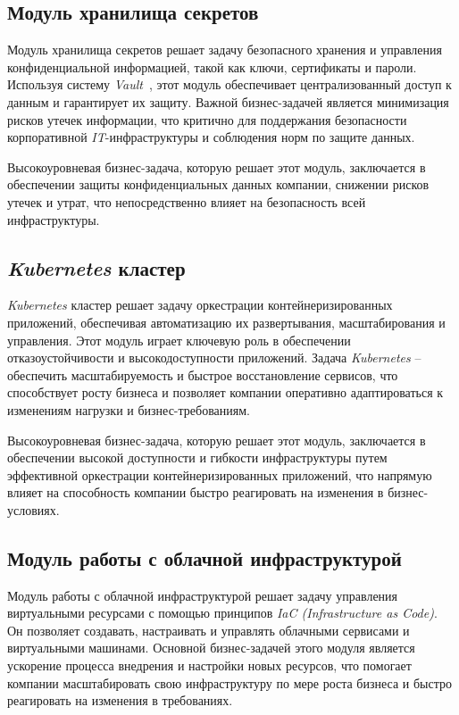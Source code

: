 \subsection{Модуль хранилища секретов} 
\label{sec:secrets_storage_module}

Модуль хранилища секретов решает задачу безопасного хранения и управления конфиденциальной информацией, такой как ключи, сертификаты и пароли. Используя систему \textit{Vault}~\cite{hashicorpvault}, этот модуль обеспечивает централизованный доступ к данным и гарантирует их защиту. Важной бизнес-задачей является минимизация рисков утечек информации, что критично для поддержания безопасности корпоративной \textit{IT}-инфраструктуры и соблюдения норм по защите данных.

Высокоуровневая бизнес-задача, которую решает этот модуль, заключается в обеспечении защиты конфиденциальных данных компании, снижении рисков утечек и утрат, что непосредственно влияет на безопасность всей инфраструктуры.

\subsection{\textit{Kubernetes} кластер} 
\label{sec:kubernetes_cluster}

\textit{Kubernetes} кластер решает задачу оркестрации контейнеризированных приложений, обеспечивая автоматизацию их развертывания, масштабирования и управления. Этот модуль играет ключевую роль в обеспечении отказоустойчивости и высокодоступности приложений. Задача \textit{Kubernetes} -- обеспечить масштабируемость и быстрое восстановление сервисов, что способствует росту бизнеса и позволяет компании оперативно адаптироваться к изменениям нагрузки и бизнес-требованиям.

Высокоуровневая бизнес-задача, которую решает этот модуль, заключается в обеспечении высокой доступности и гибкости инфраструктуры путем эффективной оркестрации контейнеризированных приложений, что напрямую влияет на способность компании быстро реагировать на изменения в бизнес-условиях.

\subsection{Модуль работы с облачной инфраструктурой} 
\label{sec:cloud_infrastructure_module}

Модуль работы с облачной инфраструктурой решает задачу управления виртуальными ресурсами с помощью принципов \textit{IaC (Infrastructure as Code)}. Он позволяет создавать, настраивать и управлять облачными сервисами и виртуальными машинами. Основной бизнес-задачей этого модуля является ускорение процесса внедрения и настройки новых ресурсов, что помогает компании масштабировать свою инфраструктуру по мере роста бизнеса и быстро реагировать на изменения в требованиях.

